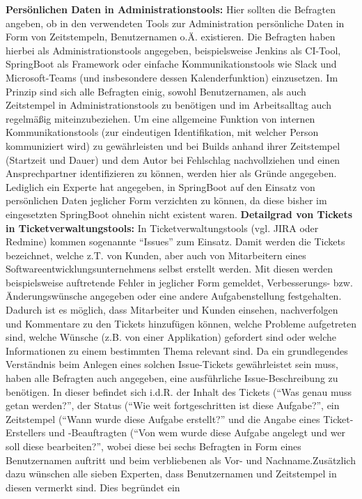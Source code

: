 \textbf{Persönlichen Daten in Administrationstools:} \newline
Hier sollten die Befragten angeben, ob in den verwendeten Tools zur Administration persönliche Daten in Form von Zeitstempeln, Benutzernamen o.Ä. existieren. Die Befragten haben hierbei als Administrationstools angegeben, beispielsweise Jenkins als CI-Tool, SpringBoot als Framework oder einfache Kommunikationstools wie Slack und Microsoft-Teams (und insbesondere dessen Kalenderfunktion)
einzusetzen. Im Prinzip sind sich alle Befragten einig, sowohl Benutzernamen, als auch Zeitstempel in Administrationstools zu benötigen und im Arbeitsalltag auch regelmäßig miteinzubeziehen. Um eine allgemeine Funktion von internen Kommunikationstools (zur eindeutigen Identifikation, mit welcher Person kommuniziert wird) zu gewährleisten und bei Builds anhand ihrer Zeitstempel (Startzeit und Dauer)
und dem Autor bei Fehlschlag nachvollziehen und einen Ansprechpartner identifizieren zu können, werden hier als Gründe angegeben. Lediglich ein Experte hat angegeben, in SpringBoot auf den Einsatz von persönlichen Daten jeglicher Form verzichten zu können, da diese bisher im eingesetzten SpringBoot ohnehin nicht existent waren. \newline \newline
\textbf{Detailgrad von Tickets in Ticketverwaltungstools:} \newline
In Ticketverwaltungstools (vgl. JIRA oder Redmine) kommen sogenannte \enquote{Issues} zum Einsatz. Damit werden die Tickets bezeichnet, welche z.T. von Kunden, aber auch von Mitarbeitern eines Softwareentwicklungsunternehmens selbst erstellt werden. Mit diesen werden beispielsweise auftretende Fehler in jeglicher Form gemeldet, Verbesserungs- bzw. Änderungswünsche angegeben
oder eine andere Aufgabenstellung festgehalten. Dadurch ist es möglich, dass Mitarbeiter und Kunden einsehen, nachverfolgen und Kommentare zu den Tickets hinzufügen können, welche Probleme aufgetreten sind, welche Wünsche (z.B. von einer Applikation) gefordert sind oder welche Informationen zu einem bestimmten Thema relevant sind. Da ein grundlegendes Verständnis beim
Anlegen eines solchen Issue-Tickets gewährleistet sein muss, haben alle Befragten auch angegeben, eine ausführliche Issue-Beschreibung zu benötigen. In dieser befindet sich i.d.R. der Inhalt des Tickets (\enquote{Was genau muss getan werden?}, der Status (\enquote{Wie weit fortgeschritten ist diese Aufgabe?}, ein Zeitstempel (\enquote{Wann wurde diese Aufgabe erstellt?} 
und die Angabe eines Ticket-Erstellers und -Beauftragten (\enquote{Von wem wurde diese Aufgabe angelegt und wer soll diese bearbeiten?}, wobei diese bei sechs Befragten in Form eines Benutzernamen auftritt und beim verbliebenen als Vor- und Nachname.Zusätzlich dazu wünschen alle sieben Experten, dass Benutzernamen und Zeitstempel in diesen vermerkt sind. Dies begründet ein 

